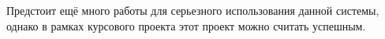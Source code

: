 
\begin{DoxyRefList}
\item[\label{todo__todo000001}%
\Hypertarget{todo__todo000001}%
page \hyperlink{index}{Титульная страница} ]Предстоит ещё много работы для серьезного использования данной системы, однако в рамках курсового проекта этот проект можно считать успешным. 
\end{DoxyRefList}